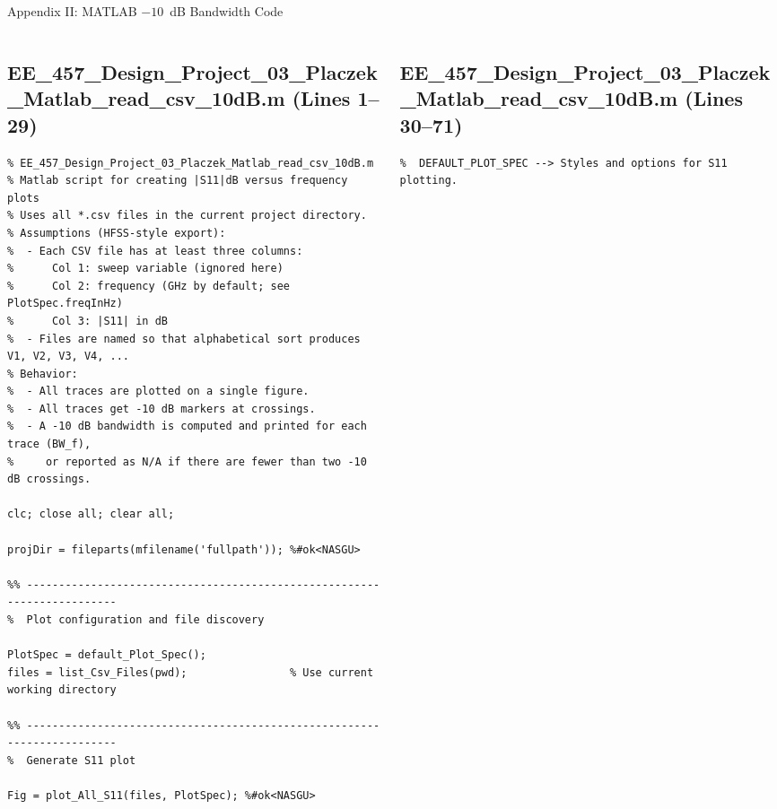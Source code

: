 \documentclass[compress,aspectratio=169,10pt]{beamer}
\begin{document}

\begin{frame}[fragile]{Appendix II: MATLAB $-10$~dB Bandwidth Code}
    \begin{columns}[T]
        \begin{column}{0.49\textwidth}
\subsection[$-10$ dB code 1]{EE\_457\_Design\_Project\_03\_Placzek\_Matlab\_read\_csv\_10dB.m (Lines 1--29)}
            \begin{lstlisting}
% EE_457_Design_Project_03_Placzek_Matlab_read_csv_10dB.m
% Matlab script for creating |S11|dB versus frequency plots
% Uses all *.csv files in the current project directory.
% Assumptions (HFSS-style export):
%  - Each CSV file has at least three columns:
%      Col 1: sweep variable (ignored here)
%      Col 2: frequency (GHz by default; see PlotSpec.freqInHz)
%      Col 3: |S11| in dB
%  - Files are named so that alphabetical sort produces V1, V2, V3, V4, ...
% Behavior:
%  - All traces are plotted on a single figure.
%  - All traces get -10 dB markers at crossings.
%  - A -10 dB bandwidth is computed and printed for each trace (BW_f),
%     or reported as N/A if there are fewer than two -10 dB crossings.

clc; close all; clear all;

projDir = fileparts(mfilename('fullpath')); %#ok<NASGU>

%% ------------------------------------------------------------------------
%  Plot configuration and file discovery

PlotSpec = default_Plot_Spec();
files = list_Csv_Files(pwd);                % Use current working directory

%% ------------------------------------------------------------------------
%  Generate S11 plot

Fig = plot_All_S11(files, PlotSpec); %#ok<NASGU>
            \end{lstlisting}
        \end{column}
        \begin{column}{0.49\textwidth}
\subsection[$-10$ dB code 2]{EE\_457\_Design\_Project\_03\_Placzek\_Matlab\_read\_csv\_10dB.m (Lines 30--71)}
            \begin{lstlisting}[firstnumber=30]
%% ------------------------------------------------------------------------
%  DEFAULT_PLOT_SPEC --> Styles and options for S11 plotting.


\end{lstlisting}
\end{column}
\end{columns}
\end{frame}
\end{document}
